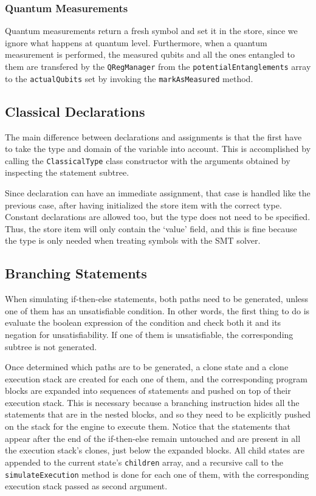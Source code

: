 \documentclass[12pt,a4paper]{report}
\theoremstyle{definition}
\theoremstyle{definition}
\theoremstyle{definition}
\begin{document}
\subsubsection{Quantum Measurements}
Quantum measurements return a fresh symbol and set it in the store, since we ignore what happens at quantum level. Furthermore, when a quantum measurement is performed, the measured qubits and all the ones entangled to them are transfered by the \texttt{QRegManager} from the \texttt{potentialEntanglements} array to the \texttt{actualQubits} set by invoking the \texttt{markAsMeasured} method.

\subsection{Classical Declarations}
The main difference between declarations and assignments is that the first have to take the type and domain of the variable into account. This is accomplished by calling the \texttt{ClassicalType} class constructor with the arguments obtained by inspecting the statement subtree.

Since declaration can have an immediate assignment, that case is handled like the previous case, after having initialized the store item with the correct type.\\
Constant declarations are allowed too, but the type does not need to be specified. Thus, the store item will only contain the `value' field, and this is fine because the type is only needed when treating symbols with the SMT solver.

\subsection{Branching Statements}
When simulating if-then-else statements, both paths need to be generated, unless one of them has an unsatisfiable condition. In other words, the first thing to do is evaluate the boolean expression of the condition and check both it and its negation for unsatisfiability. If one of them is unsatisfiable, the corresponding subtree is not generated.

Once determined which paths are to be generated, a clone state and a clone execution stack are created for each one of them, and the corresponding program blocks are expanded into sequences of statements and pushed on top of their execution stack. This is necessary because a branching instruction hides all the statements that are in the nested blocks, and so they need to be explicitly pushed on the stack for the engine to execute them. Notice that the statements that appear after the end of the if-then-else remain untouched and are present in all the execution stack's clones, just below the expanded blocks.
All child states are appended to the current state's \texttt{children} array, and a recursive call to the \texttt{simulateExecution} method is done for each one of them, with the corresponding execution stack passed as second argument.
\end{document}
